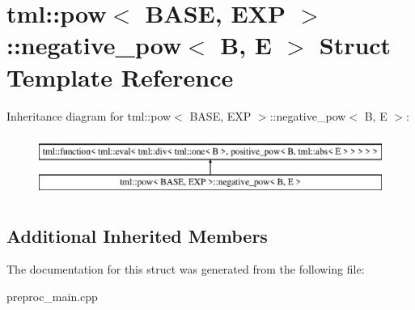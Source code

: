 \hypertarget{structtml_1_1pow_1_1negative__pow}{\section{tml\+:\+:pow$<$ B\+A\+S\+E, E\+X\+P $>$\+:\+:negative\+\_\+pow$<$ B, E $>$ Struct Template Reference}
\label{structtml_1_1pow_1_1negative__pow}
}
Inheritance diagram for tml\+:\+:pow$<$ B\+A\+S\+E, E\+X\+P $>$\+:\+:negative\+\_\+pow$<$ B, E $>$\+:\begin{figure}[H]
\begin{center}
\leavevmode
\includegraphics[height=2.000000cm]{structtml_1_1pow_1_1negative__pow}
\end{center}
\end{figure}
\subsection*{Additional Inherited Members}


The documentation for this struct was generated from the following file\+:\begin{DoxyCompactItemize}
\item 
preproc\+\_\+main.\+cpp\end{DoxyCompactItemize}

